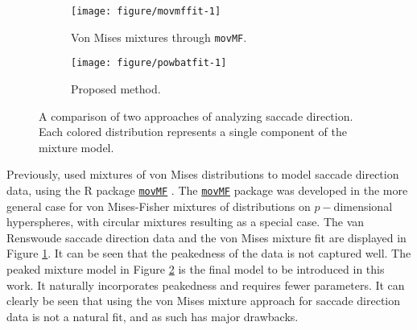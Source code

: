 \begin{figure}
  \begin{subfigure}[t]{0.5\linewidth}
    \centering
\begin{knitrout}
\color{fgcolor}
\texttt{[image: figure/movmffit-1]} 

\end{knitrout}
    \caption{Von Mises mixtures through \texttt{movMF}.}\label{scd_fit:movmf}
  \end{subfigure}%
  \begin{subfigure}[t]{0.5\linewidth}
   \centering
\begin{knitrout}
\color{fgcolor}
\texttt{[image: figure/powbatfit-1]} 

\end{knitrout}
    \caption{Proposed method.}\label{scd_fit:flexcircmix}
  \end{subfigure}
  \label{scd_fit}
  \caption{A comparison of two approaches of analyzing saccade direction. Each colored distribution represents a single component of the mixture model. }
\end{figure}

Previously, \citet{van2016infants}  used mixtures of von Mises distributions to model saccade direction data, using the R  package \href{https://cran.r-project.org/web/packages/movMF/index.html}{\texttt{movMF}} \citep{hornik2014movmf}. The \href{https://cran.r-project.org/web/packages/movMF/index.html}{\texttt{movMF}} package was developed in the more general case for von Mises-Fisher mixtures of distributions on \(p-\)dimensional hyperspheres, with circular mixtures resulting as a special case.  The van Renswoude saccade direction data and the von Mises mixture fit are displayed in Figure \ref{scd_fit:movmf}. It can be seen that the peakedness of the data is not captured well.  The peaked mixture model in Figure \ref{scd_fit:flexcircmix} is the final model to be introduced in this work. It naturally incorporates peakedness and requires fewer parameters.  It can clearly be seen that using the von Mises mixture approach for  saccade direction data is not a natural fit, and as such has major drawbacks.

